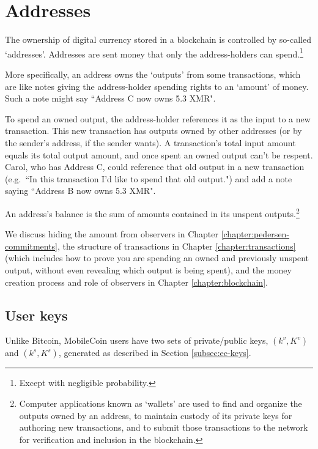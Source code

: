 \chapter{Addresses}
\label{chapter:addresses}

The ownership of digital currency stored in a blockchain is controlled by so-called `addresses'. Addresses are sent money that only the address-holders can spend.\footnote{Except with negligible probability.}

More specifically, an address owns the `outputs' from some transactions, which are like notes giving the address-holder spending rights to an `amount' of money. Such a note might say ``Address C now owns 5.3 XMR".

To spend an owned output, the address-holder references it as the input to a new transaction. This new transaction has outputs owned by other addresses (or by the sender's address, if the sender wants). A transaction's total input amount equals its total output amount, and once spent an owned output can't be respent. Carol, who has Address C, could reference that old output in a new transaction (e.g.\ ``In this transaction I'd like to spend that old output.") and add a note saying ``Address B now owns 5.3 XMR".

An address's balance is the sum of amounts contained in its unspent outputs.\footnote{Computer applications known as `wallets' are used to find and organize the outputs owned by an address, to maintain custody of its private keys for authoring new transactions, and to submit those transactions to the network for verification and inclusion in the blockchain.}

We discuss hiding the amount from observers in Chapter \ref{chapter:pedersen-commitments}, the structure of transactions in Chapter \ref{chapter:transactions} (which includes how to prove you are spending an owned and previously unspent output, without even revealing which output is being spent), and the money creation process and role of observers in Chapter \ref{chapter:blockchain}.



\section{User keys}
\label{sec:user-keys}

Unlike Bitcoin, MobileCoin users have two sets of private/public keys, \((k^v, K^v)\) and \( (k^s, K^s) \), generated as described in Section \ref{subsec:ec-keys}.

